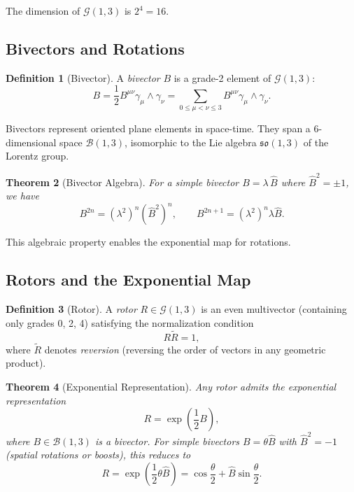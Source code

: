 \documentclass[11pt,a4paper]{article}
\numberwithin{equation}{section}
\theoremstyle{plain}
\newtheorem{theorem}{Theorem}[section]
\theoremstyle{definition}
\newtheorem{definition}[theorem]{Definition}
\theoremstyle{remark}
\newcommand{\Cl}{\mathcal{G}}               %
\newcommand{\rev}[1]{\widetilde{#1}}       %
\newcommand{\Biv}{\mathcal{B}}             %
\begin{document}
The dimension of $\Cl(1,3)$ is $2^4 = 16$.

\subsection{Bivectors and Rotations}

\begin{definition}[Bivector]
A \emph{bivector} $B$ is a grade-2 element of $\Cl(1,3)$:
\begin{equation}
B = \frac{1}{2}B^{\mu\nu}\gamma_\mu \wedge \gamma_\nu = \sum_{0 \le \mu < \nu \le 3} B^{\mu\nu}\gamma_\mu \wedge \gamma_\nu.
\label{eq:bivector-def}
\end{equation}
\end{definition}

Bivectors represent oriented plane elements in space-time. They span a 6-dimensional space $\Biv(1,3)$, isomorphic to the Lie algebra $\mathfrak{so}(1,3)$ of the Lorentz group.

\begin{theorem}[Bivector Algebra]
For a simple bivector $B = \lambda \, \hat{B}$ where $\hat{B}^2 = \pm 1$, we have
\begin{equation}
B^{2n} = (\lambda^2)^n (\hat{B}^2)^n, \qquad B^{2n+1} = (\lambda^2)^n \lambda \hat{B}.
\label{eq:bivector-powers}
\end{equation}
\end{theorem}

This algebraic property enables the exponential map for rotations.

\subsection{Rotors and the Exponential Map}

\begin{definition}[Rotor]
A \emph{rotor} $R \in \Cl(1,3)$ is an even multivector (containing only grades 0, 2, 4) satisfying the normalization condition
\begin{equation}
R \rev{R} = 1,
\label{eq:rotor-normalization}
\end{equation}
where $\rev{R}$ denotes \emph{reversion} (reversing the order of vectors in any geometric product).
\end{definition}

\begin{theorem}[Exponential Representation]
Any rotor admits the exponential representation
\begin{equation}
R = \exp\left(\frac{1}{2}B\right),
\label{eq:rotor-exponential}
\end{equation}
where $B \in \Biv(1,3)$ is a bivector. For simple bivectors $B = \theta \hat{B}$ with $\hat{B}^2 = -1$ (spatial rotations or boosts), this reduces to
\begin{equation}
R = \exp\left(\frac{1}{2}\theta\hat{B}\right) = \cos\frac{\theta}{2} + \hat{B}\sin\frac{\theta}{2}.
\label{eq:rotor-euler}
\end{equation}
\end{theorem}
\end{document}
